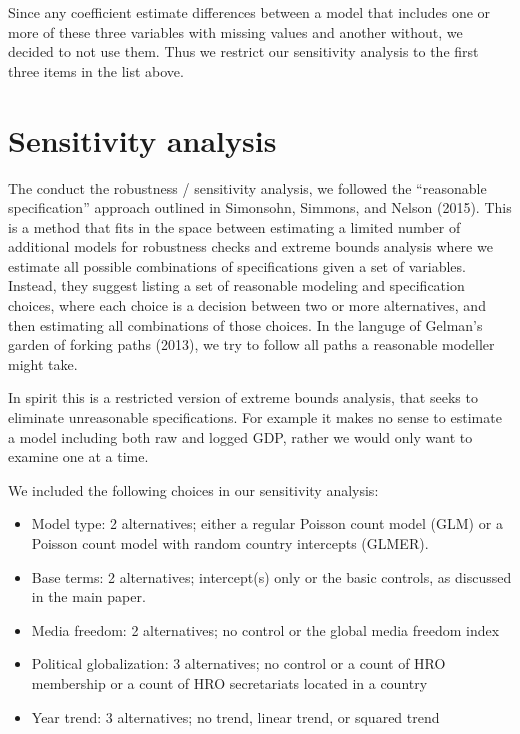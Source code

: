 \documentclass[]{article}
\providecommand{\tightlist}{%
  \setlength{\itemsep}{0pt}\setlength{\parskip}{0pt}}
\begin{document}
Since any coefficient estimate differences between a model that includes
one or more of these three variables with missing values and another
without, we decided to not use them. Thus we restrict our sensitivity
analysis to the first three items in the list above.

\hypertarget{sensitivity-analysis}{%
\section{Sensitivity analysis}\label{sensitivity-analysis}}

The conduct the robustness / sensitivity analysis, we followed the
``reasonable specification'' approach outlined in Simonsohn, Simmons,
and Nelson (2015). This is a method that fits in the space between
estimating a limited number of additional models for robustness checks
and extreme bounds analysis where we estimate all possible combinations
of specifications given a set of variables. Instead, they suggest
listing a set of reasonable modeling and specification choices, where
each choice is a decision between two or more alternatives, and then
estimating all combinations of those choices. In the languge of Gelman's
garden of forking paths (2013), we try to follow all paths a reasonable
modeller might take.

In spirit this is a restricted version of extreme bounds analysis, that
seeks to eliminate unreasonable specifications. For example it makes no
sense to estimate a model including both raw and logged GDP, rather we
would only want to examine one at a time.

We included the following choices in our sensitivity analysis:

\begin{itemize}
\tightlist
\item
  Model type: 2 alternatives; either a regular Poisson count model (GLM)
  or a Poisson count model with random country intercepts (GLMER).
\item
  Base terms: 2 alternatives; intercept(s) only or the basic controls,
  as discussed in the main paper.
\item
  Media freedom: 2 alternatives; no control or the global media freedom
  index
\item
  Political globalization: 3 alternatives; no control or a count of HRO
  membership or a count of HRO secretariats located in a country
\item
  Year trend: 3 alternatives; no trend, linear trend, or squared trend
\end{itemize}
\end{document}
